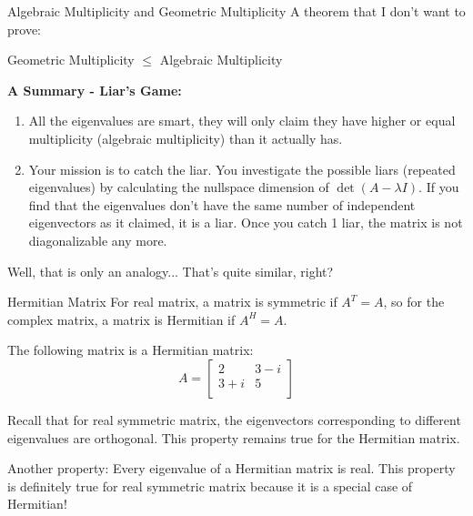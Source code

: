\documentclass{beamer}
\begin{document}
\begin{frame}{Algebraic Multiplicity and Geometric Multiplicity}
A theorem that I don't want to prove:
\begin{center}
    Geometric Multiplicity $\leq $ Algebraic Multiplicity
\end{center}

\textbf{A Summary - Liar's Game:}
\begin{enumerate}
    \item All the eigenvalues are smart, they will only claim they have higher or equal multiplicity (algebraic multiplicity) than it actually has.
    \item Your mission is to catch the liar. You investigate the possible liars (repeated eigenvalues) by calculating the nullspace dimension of $\det (A-\lambda I)$. If you find that the eigenvalues don't have the same number of independent eigenvectors as it claimed, it is a liar. Once you catch 1 liar, the matrix is not diagonalizable any more.
\end{enumerate}

Well, that is only an analogy... That's quite similar, right?
\end{frame}

\begin{frame}{Hermitian Matrix}
For real matrix, a matrix is symmetric if $A^T=A$, so for the complex matrix, a matrix is Hermitian if $A^H=A$.

\vspace{3pt}
The following matrix is a Hermitian matrix:
\begin{equation*}
    A=\left[ \begin{matrix}
        2&		3-i\\
        3+i&		5\\
    \end{matrix} \right]
\end{equation*}

Recall that for real symmetric matrix, the eigenvectors corresponding to different eigenvalues are orthogonal. This property remains true for the Hermitian matrix.

\vspace{3pt}
Another property: Every eigenvalue of a Hermitian matrix is real. This property is definitely true for real symmetric matrix because it is a special case of Hermitian!
\end{frame}
\end{document}
